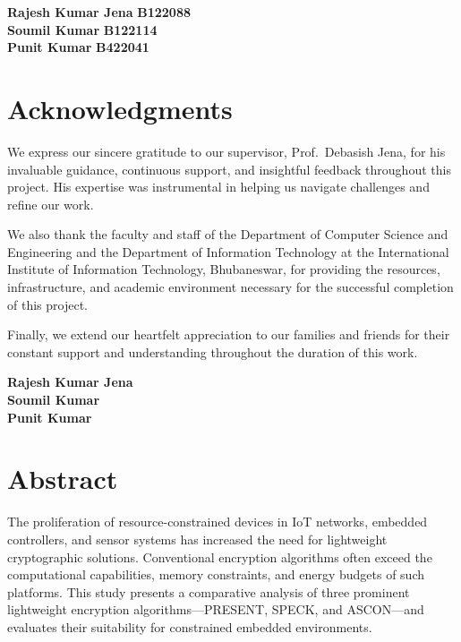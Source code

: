 \documentclass[12pt]{report}
\begin{document}
\vspace{1cm}

\noindent \textbf{Rajesh Kumar Jena} \hfill \textbf{B122088}\\
\textbf{Soumil Kumar} \hfill \textbf{B122114}\\
\textbf{Punit Kumar} \hfill \textbf{B422041}

\newpage
\chapter*{Acknowledgments}

We express our sincere gratitude to our supervisor, Prof.\ Debasish Jena, for his invaluable
guidance, continuous support, and insightful feedback throughout this project. His expertise
was instrumental in helping us navigate challenges and refine our work.

We also thank the faculty and staff of the Department of Computer Science and Engineering and
the Department of Information Technology at the International Institute of Information
Technology, Bhubaneswar, for providing the resources, infrastructure, and academic environment
necessary for the successful completion of this project.

Finally, we extend our heartfelt appreciation to our families and friends for their constant
support and understanding throughout the duration of this work.

\vspace{1cm}

\noindent \textbf{Rajesh Kumar Jena}\\
\textbf{Soumil Kumar}\\
\textbf{Punit Kumar}

\newpage
\chapter*{Abstract}

The proliferation of resource-constrained devices in IoT networks, embedded controllers,
and sensor systems has increased the need for lightweight cryptographic solutions.
Conventional encryption algorithms often exceed the computational capabilities, memory
constraints, and energy budgets of such platforms. This study presents a comparative
analysis of three prominent lightweight encryption algorithms---PRESENT, SPECK, and
ASCON---and evaluates their suitability for constrained embedded environments.
\end{document}
